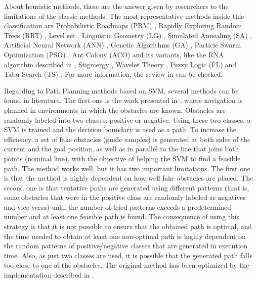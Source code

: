 About heuristic methods, these are the answer given by researchers to the limitations of the classic methods. The most representative methods inside this classification are Probabilistic Roadmaps (PRM) \cite{kavraki1996probabilistic}, Rapidly Exploring Random Trees (RRT) \cite{lavalle2000rapidly}, Level set \cite{sethian1999level}, Linguistic Geometry (LG) \cite{stilman1993network}, Simulated Annealing (SA) \cite{zhu2006robot}, Artificial Neural Network (ANN) \cite{hossain2012real}, Genetic Algorithms (GA) \cite{zhang2007evolutionary}, Particle Swarm Optimization (PSO) \cite{chen2006smooth}, Ant Colony (ACO) \cite{mou2008modified} and its variants, like the RNA algorithm described in \cite{zhu2011new}, Stigmergy \cite{cazangi2006evolutionary}, Wavelet Theory \cite{doh2005systematic}, Fuzzy Logic (FL) \cite{kladis2011energy} and Tabu Search (TS) \cite{nguyen2012multi}. For more information, the review in \cite{masehian2007classic} can be checked.

Regarding to Path Planning methods based on \ac{SVM}, several methods can be found in literature. The first one is the work presented in \cite{miura2006support}, where navigation is planned in environments in which the obstacles are known. Obstacles are randomly labeled into two classes: positive or negative. Using these two classes, a \ac{SVM} is trained and the decision boundary is used as a path. To increase the efficiency, a set of fake obstacles (guide samples) is generated at both sides of the current and the goal position, as well as in parallel to the line that joins both points (nominal line), with the objective of helping the \ac{SVM} to find a feasible path. The method works well, but it has two important limitations. The first one is that the method is highly dependent on how well fake obstacles are placed. The second one is that tentative paths are generated using different patterns (that is, some obstacles that were in the positive class are randomly labeled as negatives and vice versa) until the number of tried patterns exceeds a predetermined number and at least one feasible path is found. The consequence of using this strategy is that it is not possible to ensure that the obtained path is optimal, and the time needed to obtain at least one non-optimal path is highly dependent on the random patterns of positive/negative classes that are generated in execution time. Also, as just two classes are used, it is possible that the generated path falls too close to one of the obstacles. The original method has been optimized by the implementation described in \cite{xia2013semi}.

